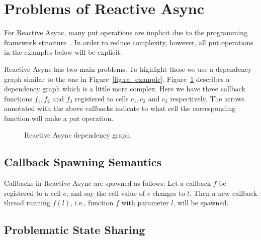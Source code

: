 \section{Problems of Reactive Async}%
\label{sec:problems_of_reactive_async}

For Reactive Async, many put operations are implicit due to the
programming framework structure~\parencite{conf/scala/HallerGES16}. In
order to reduce complexity, however, all put operations in the examples below will be
explicit.

Reactive Async has two main problems. To highlight these we use a 
dependency graph similar to the one in Figure~\ref{fig:ra_example}.
Figure~\ref{fig:ra_example2} describes a dependency graph which is a little more
complex. Here we have three callback functions $f_1, f_2$ and $f_3$ registered
to cells $c_1, c_2$ and $c_3$ respectively. The arrows annotated with the above
callbacks indicate to what cell the corresponding function will make a
put operation.

\begin{figure}
  \centering
  \caption{Reactive Async dependency graph.}
  \label{fig:ra_example2}
\end{figure}

\subsection{Callback Spawning Semantics}%
\label{sub:callback_spawning_semantics_ra}

Callbacks in Reactive Async are spawned as follows:  Let a callback $f$ be
registered to a cell $c$, and say the cell value of $c$ changes to $l$. Then a
new callback thread running $f(l)$, i.e., function $f$ with parameter $l$, will
be spawned.

\subsection{Problematic State Sharing}%
\label{sub:sharing_state}

